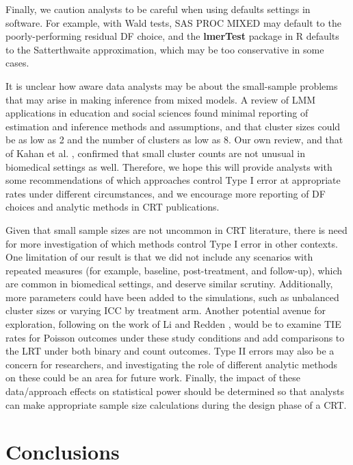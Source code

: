 \documentclass[twocolumn]{bmcart}%
\begin{document}
Finally, we caution analysts to be careful when using defaults settings in software. For example, with Wald tests, SAS PROC MIXED may default to the poorly-performing residual DF choice, and the \textbf{lmerTest} package in R defaults to the Satterthwaite approximation, which may be too conservative in some cases.

It is unclear how aware data analysts may be about the small-sample problems that may arise in making inference from mixed models. A review of LMM applications in education and social sciences \cite{dedrick_multilevel_2009} found minimal reporting of estimation and inference methods and assumptions, and that cluster sizes could be as low as 2 and the number of clusters as low as 8. Our own review, and that of Kahan et al. \cite{kahan_increased_2016}, confirmed that small cluster counts are not unusual in biomedical settings as well. Therefore, we hope this will provide analysts with some recommendations of which approaches control Type I error at appropriate rates under different circumstances, and we encourage more reporting of DF choices and analytic methods in CRT publications.

Given that small sample sizes are not uncommon in CRT literature, there is need for more investigation of which methods control Type I error in other contexts. One limitation of our result is that we did not include any scenarios with repeated measures (for example, baseline, post-treatment, and follow-up), which are common in biomedical settings, and deserve similar scrutiny. Additionally, more parameters could have been added to the simulations, such as unbalanced cluster sizes or varying ICC by treatment arm. Another potential avenue for exploration, following on the work of Li and Redden \cite{li_comparing_2015}, would be to examine TIE rates for Poisson outcomes under these study conditions and add comparisons to the LRT under both binary and count outcomes. Type II errors may also be a concern for researchers, and investigating the role of different analytic methods on these could be an area for future work. Finally, the impact of these data/approach effects on statistical power should be determined so that analysts can make appropriate sample size calculations during the design phase of a CRT.



\section*{Conclusions}
\end{document}
